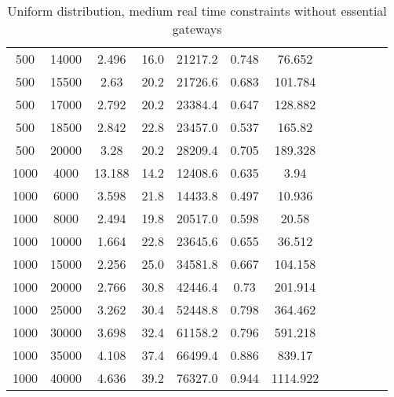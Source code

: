 \begin{table}[htb]
\begin{tabular}{|c|c|c|c|c|c|c|c|c|c|c|c|}
		500 & 14000 & 2.496 & 16.0 & 21217.2 & 0.748 & 76.652 & & & & &  \\ 
		500 & 15500 & 2.63 & 20.2 & 21726.6 & 0.683 & 101.784 & & & & &  \\ 
		500 & 17000 & 2.792 & 20.2 & 23384.4 & 0.647 & 128.882 & & & & &  \\ 
		500 & 18500 & 2.842 & 22.8 & 23457.0 & 0.537 & 165.82 & & & & &  \\ 
		500 & 20000 & 3.28 & 20.2 & 28209.4 & 0.705 & 189.328 & & & & &  \\ 
		1000 & 4000 & 13.188 & 14.2 & 12408.6 & 0.635 & 3.94 & & & & &  \\ 
		1000 & 6000 & 3.598 & 21.8 & 14433.8 & 0.497 & 10.936 & & & & &  \\ 
		1000 & 8000 & 2.494 & 19.8 & 20517.0 & 0.598 & 20.58 & & & & &  \\ 
		1000 & 10000 & 1.664 & 22.8 & 23645.6 & 0.655 & 36.512 & & & & &  \\ 
		1000 & 15000 & 2.256 & 25.0 & 34581.8 & 0.667 & 104.158 & & & & &  \\ 
		1000 & 20000 & 2.766 & 30.8 & 42446.4 & 0.73 & 201.914 & & & & &  \\ 
		1000 & 25000 & 3.262 & 30.4 & 52448.8 & 0.798 & 364.462 & & & & &  \\ 
		1000 & 30000 & 3.698 & 32.4 & 61158.2 & 0.796 & 591.218 & & & & &  \\ 
		1000 & 35000 & 4.108 & 37.4 & 66499.4 & 0.886 & 839.17 & & & & &  \\ 
		1000 & 40000 & 4.636 & 39.2 & 76327.0 & 0.944 & 1114.922 & & & & &  \\ 
		\hline 
	\end{tabular} 
	\caption{Uniform distribution, medium real time constraints without essential gateways} 
	\label{tab:unif_medium_n_esc} 
\end{table} 

